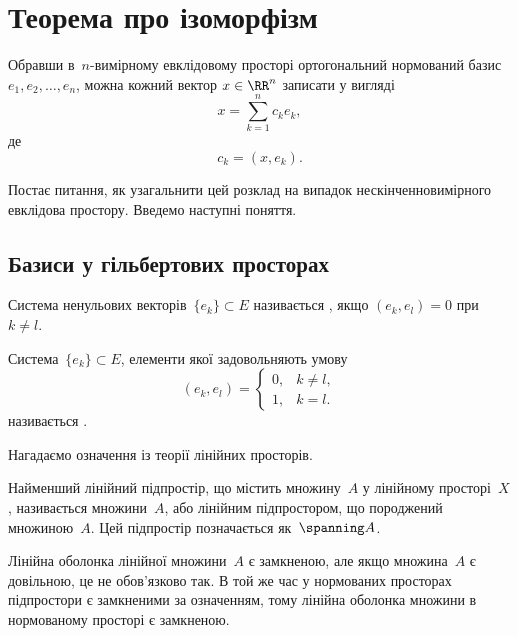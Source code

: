 \chapter{Теорема про ізоморфізм}

Обравши в~$n$-вимірному евклідовому просторі
ортогональний нормований базис~$e_1, e_2, \dots, e_n$, можна
кожний вектор
$x \in \RR^n$ записати у вигляді
\begin{equation*}
    x = \sum_{k = 1}^n c_k e_k,
\end{equation*}
де 
\begin{equation*}
    c_k = (x, e_k).
\end{equation*}

Постає питання, як узагальнити цей розклад на випадок
нескінченновимірного евклідова простору. Введемо
наступні поняття.

\section{Базиси у гільбертових просторах}

\begin{definition}
Система ненульових векторів~$\{e_k\} \subset E$
називається , якщо
$(e_k, e_l) = 0$ при~$k \ne l$.
\end{definition}

\begin{definition}
Система~$\{e_k\} \subset E$, елементи якої
задовольняють умову
\begin{equation*}
    (e_k, e_l) = \begin{cases}
        0, & k \ne l, \\
        1, & k = l.
    \end{cases}
\end{equation*}
називається .
\end{definition}

Нагадаємо означення із теорії лінійних просторів.

\begin{definition}
Найменший лінійний підпростір, що містить
множину~$A$ у лінійному просторі~$X$, називається
 множини~$A$, або лінійним
підпростором, що породжений множиною~$A$. Цей
підпростір позначається як~$\spanning A$.
\end{definition}

\begin{remark}
Лінійна оболонка лінійної множини~$A$
є замкненою, але якщо множина~$A$ є довільною, це не
обов’язково так. В той же час у нормованих просторах
підпростори є замкненими за означенням, тому лінійна
оболонка множини в нормованому просторі є замкненою.
\end{remark}

